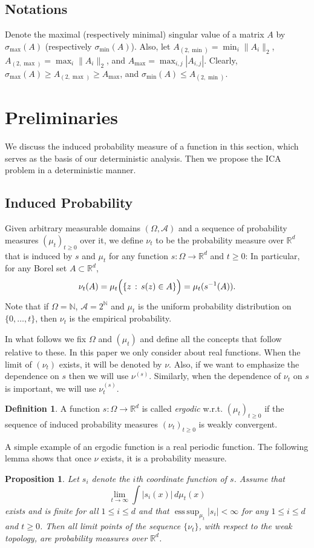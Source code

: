 \documentclass[twoside]{article}
\newcommand{\scom}[1]{s_{#1}}
\newcommand{\cset}[2]{\left\{#1\,:\,#2\right\}}
\newcommand{\ra}{\rightarrow}
\newcommand{\real}{\mathbb{R}}
\DeclareMathOperator{\esssup}{ess\,sup}
\renewcommand{\natural}{\mathbb{N}}
\newtheorem{prop}[lemma]{Proposition}
\theoremstyle{definition}
\newtheorem{definition}[lemma]{Definition}
\renewcommand{\AA}{\mathcal{A}}
\begin{document}
\subsection{Notations}
Denote the maximal (respectively minimal) singular value of a matrix $A$ by  $\sigma_{\max}(A)$ (respectively $\sigma_{\min}(A)$). Also, let $A_{(2,\min)} = \min_{i} \|A_i\|_2$, $A_{(2,\max)} = \max_{i} \|A_i\|_2$, and $A_{\max} = \max_{i,j} |A_{i,j}|$. 
Clearly, $\sigma_{\max}(A) \ge A_{(2,\max)} \ge A_{\max}$, and $\sigma_{\min}(A) \le A_{(2,\min)}$.


\section{Preliminaries}
\label{sec:Preliminaries}
We discuss the induced probability measure of a function in this section, which serves as the basis of our deterministic analysis. 
Then we propose the ICA problem in a deterministic manner. 
\subsection{Induced Probability}
\label{subsec:InducesProb}
Given arbitrary measurable domains $(\Omega,\AA)$ and a sequence of probability measures $(\mu_t)_{t\ge0}$ over it, we define $\nu_t$ to be the probability measure over $\real^d$ that is induced by $s$ and $\mu_t$ for any function $s: \Omega \ra \real^d$ and $t\ge 0$:
In particular, for any Borel set $A\subset \real^d$,
\[
\nu_t(A)= \mu_t\Bigl( \cset{z}{s(z)\in A} \Bigr)
= \mu_t ( s^{-1}(A) ).
\]
Note that if $\Omega = \natural$, $\AA = 2^\natural$ and $\mu_t$ is the uniform probability distribution on $\{0,\ldots,t\}$, then $\nu_t$ is the empirical probability.

In what follows we fix $\Omega$ and $(\mu_t)$ and define all the concepts that follow relative to these. 
In this paper we only consider about real functions.
When the limit of $(\nu_t)$ exists, it will be denoted by $\nu$.
Also, if we want to emphasize the dependence on $s$ then we will use $\nu^{(s)}$.
Similarly, when the dependence of $\nu_t$ on $s$ is important, we will use $\nu^{(s)}_t$.
\begin{definition}
A function $s:\Omega \rightarrow \real^d$ is called \emph{ergodic} w.r.t. $(\mu_t)_{t\ge0}$
if the sequence of  induced probability measures $(\nu_t)_{t\ge 0}$ is weakly convergent.
\end{definition}
A simple example of an ergodic function is a real periodic function.
The following lemma shows that once $\nu$ exists, it is a probability measure. 
\begin{prop}
\label{prop:ergodicfunction}
Let $\scom{i}$ denote the $i$th coordinate function of $s$. Assume that
\[
\lim_{t\to\infty} \int |\scom{i}(x)|\, d\mu_t(x) 
\]
exists and is finite for all $1 \le i \le d$ and that $\esssup_{\mu_t} |\scom{i}|<\infty$ for any $1\le i \le d$ and $t\ge 0$.
Then all limit points of the sequence $\{\nu_t\}$, with respect to the weak topology, are probability measures over $\real^d$.
\end{prop}
\end{document}
